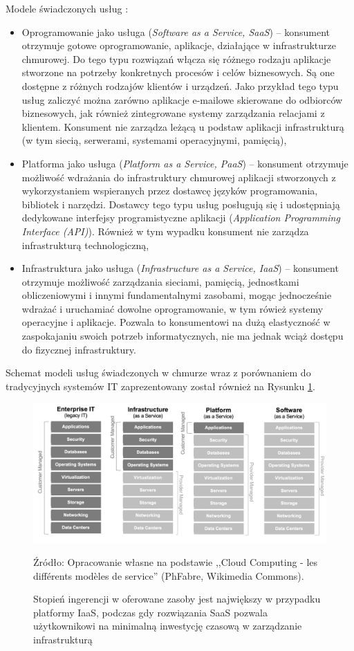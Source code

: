 \documentclass[12pt,a4paper,twoside]{article}
\newcommand{\source}[1]{\caption*{\hfill Źródło: {#1}} }
\begin{document}
\noindent
Modele świadczonych usług :
\begin{itemize}
\item Oprogramowanie jako usługa (\textit{Software as a Service, SaaS}) -- konsument otrzymuje gotowe oprogramowanie, aplikacje, działające w infrastrukturze chmurowej. Do tego typu rozwiązań włącza się różnego rodzaju aplikacje stworzone na potrzeby konkretnych procesów i celów biznesowych. Są one dostępne z różnych rodzajów klientów i urządzeń. Jako przykład tego typu usług zaliczyć można zarówno aplikacje e-mailowe skierowane do odbiorców biznesowych, jak również zintegrowane systemy zarządzania relacjami z klientem. Konsument nie zarządza leżącą u podstaw aplikacji infrastrukturą (w tym siecią, serwerami, systemami operacyjnymi, pamięcią),
\item Platforma jako usługa (\textit{Platform as a Service, PaaS}) -- konsument otrzymuje możliwość wdrażania do infrastruktury chmurowej aplikacji stworzonych z wykorzystaniem wspieranych przez dostawcę języków programowania, bibliotek i narzędzi. Dostawcy tego typu usług posługują się i udostępniają dedykowane interfejsy programistyczne aplikacji (\textit{Application Programming Interface (API)}). Również w tym wypadku konsument nie zarządza infrastrukturą technologiczną,
\item Infrastruktura jako usługa (\textit{Infrastructure as a Service, IaaS}) -- konsument otrzymuje możliwość zarządzania sieciami, pamięcią, jednostkami obliczeniowymi i innymi fundamentalnymi zasobami, mogąc jednocześnie wdrażać i uruchamiać dowolne oprogramowanie, w tym rówież systemy operacyjne i aplikacje. Pozwala to konsumentowi na dużą elastyczność w zaspokajaniu swoich potrzeb informatycznych, nie ma jednak wciąż dostępu do fizycznej infrastruktury.
\end{itemize}

Schemat modeli usług świadczonych w chmurze wraz z porównaniem do tradycyjnych systemów IT zaprezentowany został również na Rysunku \ref{fig:cloudarch}.

\begin{figure}[h]
  \centering
\includegraphics[width=\textwidth, keepaspectratio]{../obrazy/fig:cloudarch.png}
\caption{Stopień ingerencji w oferowane zasoby jest największy w przypadku platformy IaaS, podczas gdy rozwiązania SaaS pozwala użytkownikowi na minimalną inwestycję czasową w zarządzanie infrastrukturą \label{fig:cloudarch}}
\source{Opracowanie własne na podstawie ,,Cloud Computing - les différents modèles de service'' (PhFabre, Wikimedia Commons).}
\end{figure}
\end{document}

